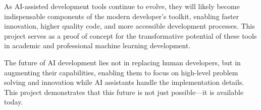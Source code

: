 As AI-assisted development tools continue to evolve, they will likely become indispensable components of the modern developer's toolkit, enabling faster innovation, higher quality code, and more accessible development processes. This project serves as a proof of concept for the transformative potential of these tools in academic and professional machine learning development.

The future of AI development lies not in replacing human developers, but in augmenting their capabilities, enabling them to focus on high-level problem solving and innovation while AI assistants handle the implementation details. This project demonstrates that this future is not just possible—it is available today.

\newpage




